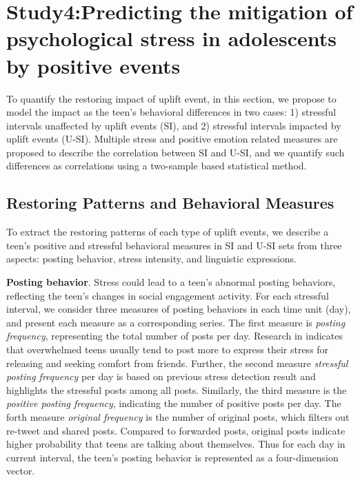 \section{Study4:Predicting the mitigation of psychological stress in adolescents by positive events}
To quantify the restoring impact of uplift event,
in this section, we propose to model the impact as the teen's behavioral differences in two cases:
1) stressful intervals unaffected by uplift events (SI), and 2) stressful intervals impacted by uplift events (U-SI).
Multiple stress and positive emotion related measures are proposed to describe the correlation between SI and U-SI,
and we quantify such differences as correlations using a two-sample based statistical method.

\subsection{Restoring Patterns and Behavioral Measures}
\label{subsec:pattern}
To extract the restoring patterns of each type of uplift events,
we describe a teen's positive and stressful behavioral measures in SI and U-SI sets from three aspects:
posting behavior, stress intensity, and linguistic expressions.

\textbf{Posting behavior}.
Stress could lead to a teen's abnormal posting behaviors,
reflecting the teen's changes in social engagement activity.
For each stressful interval,
we consider three measures of posting behaviors in each time unit (day),
and present each measure as a corresponding series.
The first measure is \emph{posting frequency},
representing the total number of posts per day.
Research in \cite{Li2017Analyzing} indicates that overwhelmed teens usually tend to post more to express their stress for releasing
and seeking comfort from friends.
Further, the second measure \emph{stressful posting frequency} per day
is based on previous stress detection result and highlights the stressful posts among all posts.
Similarly, the third measure is the \emph{positive posting frequency}, indicating the number of positive posts per day.
The forth measure \emph{original frequency} is the number of original posts, which filters out re-tweet and shared posts.
Compared to forwarded posts, original posts indicate higher probability that teens are talking about themselves.
Thus for each day in current interval, the teen's posting behavior is represented as a four-dimension vector.


